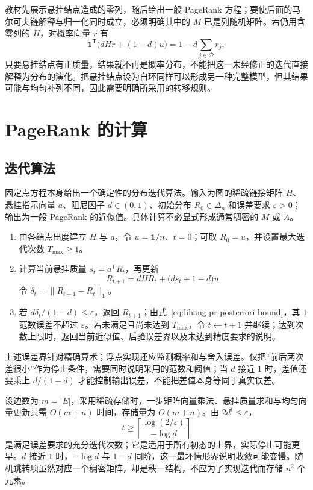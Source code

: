 \begin{notealert}[type=caution,title={阻尼平滑不能代替零列修正}]
教材先展示悬挂结点造成的零列，随后给出一般 PageRank 方程；要使后面的马尔可夫链解释与归一化同时成立，必须明确其中的 $M$ 已是列随机矩阵。若仍用含零列的 $H$，对概率向量 $r$ 有
\[
    \boldsymbol1^{\mathsf T}\bigl(dHr+(1-d)u\bigr)
    =1-d\sum_{j\in\mathcal D}r_j,
\]
只要悬挂结点有正质量，结果就不再是概率分布，不能把这一未经修正的迭代直接解释为分布的演化。把悬挂结点设为自环同样可以形成另一种完整模型，但其结果可能与均匀补列不同，因此需要明确所采用的转移规则。
\end{notealert}

\section{PageRank 的计算}
\label{sec:lihang-pr-computation}

\subsection{迭代算法}
\label{subsec:lihang-pr-iteration}

固定点方程本身给出一个确定性的分布迭代算法。输入为图的稀疏链接矩阵 $H$、悬挂指示向量 $a$、阻尼因子 $d\in(0,1)$、初始分布 $R_0\in\Delta_n$ 和误差要求 $\varepsilon>0$；输出为一般 PageRank 的近似值。具体计算不必显式形成通常稠密的 $M$ 或 $A$。
\begin{enumerate}
    \item 由各结点出度建立 $H$ 与 $a$，令 $u=\boldsymbol1/n$、$t=0$；可取 $R_0=u$，并设置最大迭代次数 $T_{\max}\geq1$。
    \item 计算当前悬挂质量 $s_t=a^{\mathsf T}R_t$，再更新
    \begin{equation}
    \label{eq:lihang-pr-sparse-update}
        R_{t+1}=dHR_t+\bigl(ds_t+1-d\bigr)u.
    \end{equation}
    令 $\delta_t=\|R_{t+1}-R_t\|_1$。
    \item 若 $d\delta_t/(1-d)\leq\varepsilon$，返回 $R_{t+1}$；由式~\eqref{eq:lihang-pr-posteriori-bound}，其 $1$ 范数误差不超过 $\varepsilon$。若未满足且尚未达到 $T_{\max}$，令 $t\gets t+1$ 并继续；达到次数上限时，返回当前近似值、后验误差界以及未达到精度要求的说明。
\end{enumerate}
上述误差界针对精确算术；浮点实现还应监测概率和与舍入误差。仅把“前后两次差很小”作为停止条件，需要同时说明采用的范数和阈值；当 $d$ 接近 $1$ 时，差值还要乘上 $d/(1-d)$ 才能控制输出误差，不能把差值本身等同于真实误差。

设边数为 $m=|E|$，采用稀疏存储时，一步矩阵向量乘法、悬挂质量求和与均匀向量更新共需 $O(m+n)$ 时间，存储量为 $O(m+n)$。由 $2d^t\leq\varepsilon$，
\[
    t\geq\left\lceil\frac{\log(2/\varepsilon)}{-\log d}\right\rceil
\]
是满足误差要求的充分迭代次数；它是适用于所有初态的上界，实际停止可能更早。$d$ 接近 $1$ 时，$-\log d$ 与 $1-d$ 同阶，这一最坏情形界说明收敛可能变慢。随机跳转项虽然对应一个稠密矩阵，却是秩一结构，不应为了实现迭代而存储 $n^2$ 个元素。

